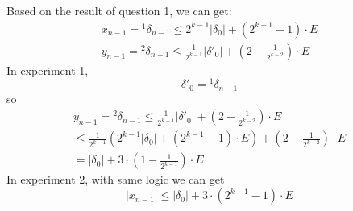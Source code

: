 \documentclass[12pt]{article}
\begin{document}
\begin{enumerate}
\begin{enumerate}
  Based on the result of question 1, we can get:
\[\begin{array}{l}
{x_{n - 1}} = {}^1{\delta _{n - 1}} \le {2^{k - 1}}\left| {{\delta _0}} \right| + ({2^{k - 1}} - 1) \cdot E\\
{y_{n - 1}} = {}^2{\delta _{n - 1}} \le \frac{1}{{{2^{k - 1}}}}\left| {{{\delta '}_0}} \right| + (2 - \frac{1}{{{2^{k - 2}}}}) \cdot E
\end{array}\]
    In experiment 1, 
  \[{{\delta '}_0} = {}^1{\delta _{n - 1}}\]
  so 
\[\begin{array}{l}
{y_{n - 1}} = {}^2{\delta _{n - 1}} \le \frac{1}{{{2^{k - 1}}}}\left| {{{\delta '}_0}} \right| + (2 - \frac{1}{{{2^{k - 2}}}}) \cdot E\\
 \le \frac{1}{{{2^{k - 1}}}}({2^{k - 1}}\left| {{\delta _0}} \right| + ({2^{k - 1}} - 1) \cdot E) + (2 - \frac{1}{{{2^{k - 2}}}}) \cdot E\\
 = \left| {{\delta _0}} \right| + 3 \cdot (1 - \frac{1}{{{2^{k - 1}}}}) \cdot E
\end{array}\]
  In experiment 2, with same logic we can get \[\left| {{x_{n - 1}}} \right| \le \left| {{\delta _0}} \right| + 3 \cdot ({2^{k - 1}} - 1) \cdot E\]
  
  \end{enumerate}

\end{enumerate}
\end{document}
